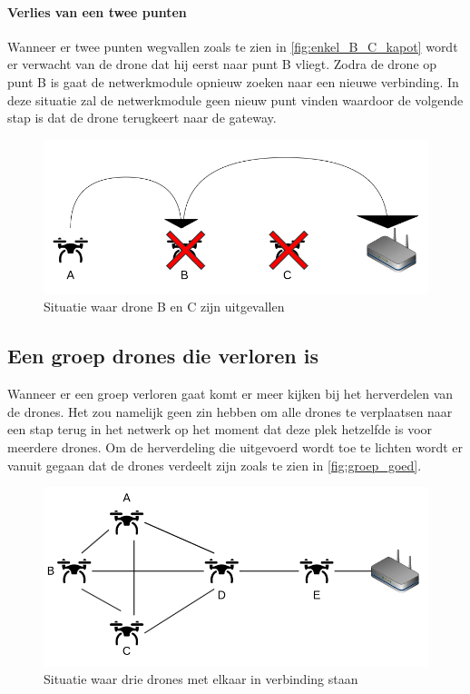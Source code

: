 \documentclass[a4paper, 11pt, oneside]{report}
\begin{document}
\paragraph{Verlies van een twee punten}
Wanneer er twee punten wegvallen zoals te zien in \autoref{fig:enkel_B_C_kapot} wordt er verwacht van de drone dat hij eerst naar punt B vliegt.
Zodra de drone op punt B is gaat de netwerkmodule opnieuw zoeken naar een nieuwe verbinding.
In deze situatie zal de netwerkmodule geen nieuw punt vinden waardoor de volgende stap is dat de drone terugkeert naar de gateway.  
\begin{figure}[H]
	\begin{center}\includegraphics[width=1\linewidth]{Afbeeldingen/droneopstelling_enkel_B_en_C_kapot.png}\end{center}
	\caption{Situatie waar drone B en C zijn uitgevallen}
	\label{fig:enkel_B_C_kapot}
\end{figure}
 
\subsection{Een groep drones die verloren is}\label{sec:een-groep-drones-die-verloren-is}

Wanneer er een groep verloren gaat komt er meer kijken bij het herverdelen van de drones.
Het zou namelijk geen zin hebben om alle drones te verplaatsen naar een stap terug in het netwerk op het moment dat deze plek hetzelfde is voor meerdere drones.
Om de herverdeling die uitgevoerd wordt toe te lichten wordt er vanuit gegaan dat de drones verdeelt zijn zoals te zien in \autoref{fig:groep_goed}.

\begin{figure}[H]
	\begin{center}\includegraphics[width=1\linewidth]{Afbeeldingen/droneopstelling_Groep_goed.png}\end{center}
	\caption{Situatie waar drie drones met elkaar in verbinding staan}
	\label{fig:groep_goed}
\end{figure} 
\end{document}
